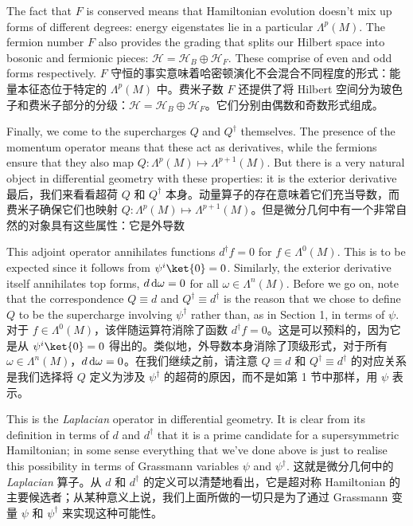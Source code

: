 \documentclass{article}
\begin{document}
\begin{paracol}{2}
The fact that $F$ is conserved means that Hamiltonian evolution doesn’t mix up forms of diﬀerent degrees: energy eigenstates lie in a particular $\Lambda^{p}(M)$. The fermion number $F$ also provides the grading that splits our Hilbert space into bosonic and fermionic pieces: $\mathcal{H} = \mathcal{H}_B \oplus \mathcal{H}_F$. These comprise of even and odd forms respectively.
\switchcolumn
$F$ 守恒的事实意味着哈密顿演化不会混合不同程度的形式：能量本征态位于特定的 $\Lambda^{p}(M)$ 中。费米子数 $F$ 还提供了将 Hilbert 空间分为玻色子和费米子部分的分级：$\mathcal{H} = \mathcal{H}_B \oplus \mathcal{H}_F$。它们分别由偶数和奇数形式组成。
\switchcolumn*

Finally, we come to the supercharges $Q$ and $Q^{\dagger}$ themselves. The presence of the momentum operator means that these act as derivatives, while the fermions ensure that they also map $Q: \Lambda^p(M) \mapsto \Lambda^{p + 1}(M)$. But there is a very natural object in diﬀerential geometry with these properties: it is the exterior derivative
\switchcolumn
最后，我们来看看超荷 $Q$ 和 $Q^{\dagger}$ 本身。动量算子的存在意味着它们充当导数，而费米子确保它们也映射 $Q: \Lambda^p(M) \mapsto \Lambda^{p + 1}(M)$。但是微分几何中有一个非常自然的对象具有这些属性：它是外导数
\switchcolumn*

This adjoint operator annihilates functions $d^{\dagger} f = 0$ for $f \in \Lambda^0(M)$. This is to be expected since it follows from $\psi^i \ket{0} = 0$. Similarly, the exterior derivative itself annihilates top forms, $d\odif{\omega} = 0$ for all $\omega \in \Lambda^n(M)$. Before we go on, note that the correspondence $Q \equiv d$ and $Q^{\dagger} \equiv d^{\dagger}$ is the reason that we chose to deﬁne $Q$ to be the supercharge involving $\psi^{\dagger}$ rather than, as in Section 1, in terms of $\psi$.
\switchcolumn
对于 $f \in \Lambda^0(M)$，该伴随运算符消除了函数 $d^{\dagger} f = 0$。这是可以预料的，因为它是从 $\psi^i \ket{0} = 0$ 得出的。类似地，外导数本身消除了顶级形式，对于所有 $\omega \in \Lambda^n(M)$，$d\odif{\omega} = 0$。在我们继续之前，请注意 $Q \equiv d$ 和 $Q^{\dagger} \equiv d^{\dagger}$ 的对应关系是我们选择将 $Q$ 定义为涉及 $\psi^{\dagger}$ 的超荷的原因，而不是如第 1 节中那样，用 $\psi$ 表示。
\switchcolumn*

This is the \textit{Laplacian} operator in diﬀerential geometry. It is clear from its deﬁnition in terms of $d$ and $d^{\dagger}$ that it is a prime candidate for a supersymmetric Hamiltonian; in some sense everything that we’ve done above is just to realise this possibility in terms of Grassmann variables $\psi$ and $\psi^{\dagger}$.
\switchcolumn
这就是微分几何中的 \textit{Laplacian} 算子。从 $d$ 和 $d^{\dagger}$ 的定义可以清楚地看出，它是超对称 Hamiltonian 的主要候选者；从某种意义上说，我们上面所做的一切只是为了通过 Grassmann 变量 $\psi$ 和 $\psi^{\dagger}$ 来实现这种可能性。
\switchcolumn*


\end{paracol}
\end{document}
